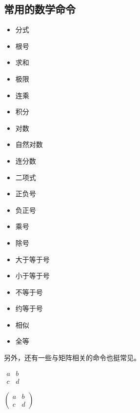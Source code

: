 {{{\subsection{常用的数学命令}
\begin{itemize}[nosep]
	\item 分式 
	\item 根号 
	\item 求和 
	\item 极限 
	\item 连乘 
	\item 积分 
	\item 对数 
	\item 自然对数 
	\item 连分数 
	\item 二项式 
	\item 正负号 \inlinedemo{\pm}
	\item 负正号 \inlinedemo{\mp}
	\item 乘号 \inlinedemo{\times}
	\item 除号 \inlinedemo{\div}
	\item 大于等于号 \inlinedemo{\ge}
	\item 小于等于号 \inlinedemo{\le}
	\item 不等于号 \inlinedemo{\ne}
	\item 约等于号 \inlinedemo{\approx}
	\item 相似 \inlinedemo{\sim}
	\item 全等 \inlinedemo{\cong}
\end{itemize}
\vspace{1cm}
另外，还有一些与矩阵相关的命令也挺常见。
\begin{texlst}
\begin{math}
\begin{matrix}
	a & b \\
	c & d
\end{matrix}
\end{math}
\end{texlst}
\vfill
\pagebreak

\begin{texlst}
\begin{math}
\begin{pmatrix}
	a & b \\
	c & d
\end{pmatrix}
\end{math}
\end{texlst}

}}}
